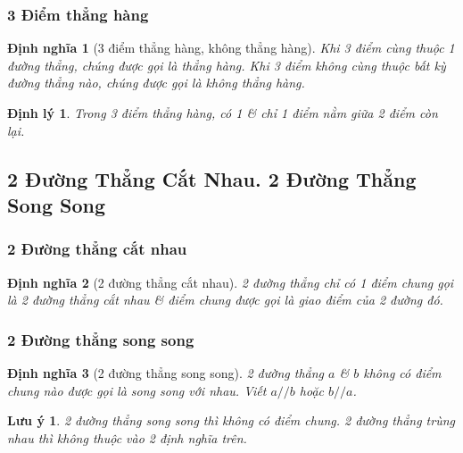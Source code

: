 \documentclass{article}
\numberwithin{equation}{section}
\newtheorem{dinhnghia}{Định nghĩa}[section]
\newtheorem{luuy}{Lưu ý}[section]
\newtheorem{dinhly}{Định lý}[section]
\begin{document}
\subsubsection{3 Điểm thẳng hàng}

\begin{dinhnghia}[3 điểm thẳng hàng, không thẳng hàng]
	Khi 3 điểm cùng thuộc 1 đường thẳng, chúng được gọi là \emph{thẳng hàng}. Khi 3 điểm không cùng thuộc bất kỳ đường thẳng nào, chúng được gọi là \emph{không thẳng hàng}.
\end{dinhnghia}

\begin{dinhly}
	Trong 3 điểm thẳng hàng, có 1 \textit{\&} chỉ 1 điểm nằm giữa 2 điểm còn lại.
\end{dinhly}


\subsection{2 Đường Thẳng Cắt Nhau. 2 Đường Thẳng Song Song}

\subsubsection{2 Đường thẳng cắt nhau}

\begin{dinhnghia}[2 đường thẳng cắt nhau]
	2 đường thẳng chỉ có 1 điểm chung gọi là \emph{2 đường thẳng cắt nhau} \textit{\&} điểm chung được gọi là \emph{giao điểm} của 2 đường đó.
\end{dinhnghia}

\subsubsection{2 Đường thẳng song song}

\begin{dinhnghia}[2 đường thẳng song song]
	2 đường thẳng $a$ \textit{\&} $b$ không có điểm chung nào được gọi là \emph{song song với nhau}. Viết $a//b$ hoặc $b//a$.
\end{dinhnghia}

\begin{luuy}
	2 đường thẳng song song thì không có điểm chung. 2 đường thẳng \emph{trùng nhau} thì không thuộc vào 2 định nghĩa trên.
\end{luuy}

\end{document}

